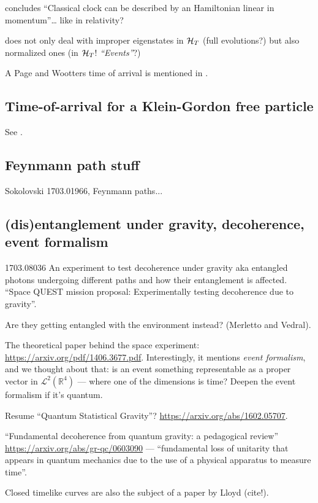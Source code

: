 \cite{HarmonicClocks} concludes ``Classical clock can be described by an Hamiltonian linear in momentum''\dots
like in relativity?

\cite{Lloyd:Time} does not only deal with improper eigenstates in $\mathcal{H}_T$
(full evolutions?)
but also normalized ones (in $\mathcal{H}_T$! \emph{``Events''}?)

A Page and Wootters time of arrival is mentioned in \cite{Gambini_PW}.

\subsection{Time-of-arrival for a Klein-Gordon free particle}

See \cite{Galapon_KG}.

\subsection{Feynmann path stuff}

Sokolovski 1703.01966, Feynmann paths...\subsection{(dis)entanglement under gravity, decoherence, event formalism}

1703.08036 An experiment to test decoherence under gravity aka entangled photons undergoing different paths and how their entanglement is affected.
``Space QUEST mission proposal: Experimentally testing decoherence due to gravity''.

Are they getting entangled with the environment instead? (Merletto and Vedral).

The theoretical paper behind the space experiment: \url{https://arxiv.org/pdf/1406.3677.pdf}. Interestingly, it mentions 
\emph{event formalism}, and we thought about that: is an event something
representable as a proper vector in $\mathcal{L}^2(\mathbb{R}^4)$ --- where one of the dimensions is time?
Deepen the event formalism if it's quantum.

Resume ``Quantum Statistical Gravity''? \url{https://arxiv.org/abs/1602.05707}.

``Fundamental decoherence from quantum gravity: a pedagogical review''
\url{https://arxiv.org/abs/gr-qc/0603090} ---
``fundamental loss of unitarity
that appears in quantum mechanics
due to the use of a physical apparatus to measure time''.

Closed timelike curves are also the subject of a paper by Lloyd (cite!).


